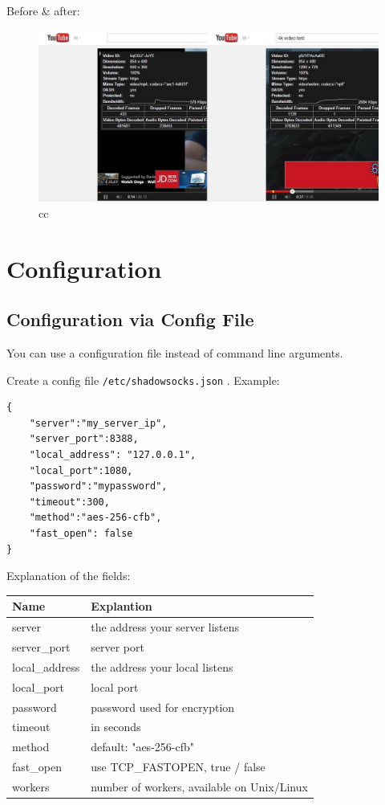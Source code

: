 \documentclass[11pt,a4paper]{sphinxmanual}
\begin{document}
Before \& after:
\begin{figure}[H]
\centering
\includegraphics[keepaspectratio,max width=0.95\linewidth]{images/10c34b04-f5d9-11e3-95fc-e38f5299c274.jpg}
\caption{cc}
\end{figure}


\chapter{Configuration}
\label{sec-5}
\label{sec:cvcf}
\section{Configuration via Config File}
\label{sec-5-1}
You can use a configuration file instead of command line arguments.

Create a config file \verb~/etc/shadowsocks.json~ . Example:

\begin{verbatim}
{
    "server":"my_server_ip",
    "server_port":8388,
    "local_address": "127.0.0.1",
    "local_port":1080,
    "password":"mypassword",
    "timeout":300,
    "method":"aes-256-cfb",
    "fast_open": false
}
\end{verbatim}

Explanation of the fields:

\begin{center}
\begin{tabular}{ll}
\toprule
Name & Explantion\\
\midrule
server & the address your server listens\\
server\_port & server port\\
local\_address & the address your local listens\\
local\_port & local port\\
password & password used for encryption\\
timeout & in seconds\\
method & default: "aes-256-cfb"\\
fast\_open & use TCP\_FASTOPEN, true / false\\
workers & number of workers, available on Unix/Linux\\
\bottomrule
\end{tabular}
\end{center}
\end{document}
